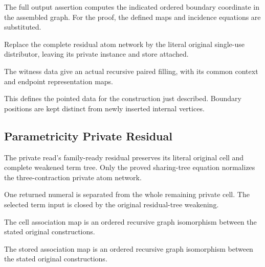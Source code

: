 The full output assertion computes the indicated ordered boundary coordinate in the assembled graph.
For the proof, the defined maps and incidence equations are substituted.
\par{}

Replace the complete residual atom network by the literal original single-use distributor, leaving its private instance and store attached.
\par{}

The witness data give an actual recursive paired filling, with its common context and endpoint representation maps.
\par{}

This defines the pointed data for the construction just described. Boundary positions are kept distinct from newly inserted internal vertices.
\par{}

\subsection{Parametricity Private Residual}
The private read's family-ready residual preserves its literal original cell and complete weakened term tree. Only the proved sharing-tree equation normalizes the three-contraction private atom network.

One returned numeral is separated from the whole remaining private cell. The selected term input is closed by the original residual-tree weakening.
\par{}

The cell association map is an ordered recursive graph isomorphism between the stated original constructions.
\par{}

The stored association map is an ordered recursive graph isomorphism between the stated original constructions.
\par{}

